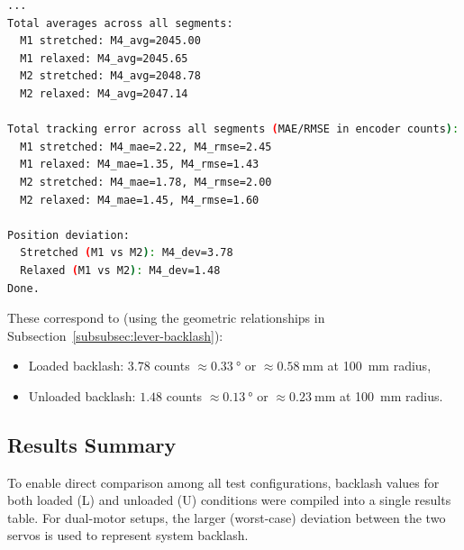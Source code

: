 \documentclass[11pt,letterpaper]{article}
\begin{document}
\begin{lstlisting}[language=bash, numbers=none]
...
Total averages across all segments:
  M1 stretched: M4_avg=2045.00
  M1 relaxed: M4_avg=2045.65
  M2 stretched: M4_avg=2048.78
  M2 relaxed: M4_avg=2047.14

Total tracking error across all segments (MAE/RMSE in encoder counts):
  M1 stretched: M4_mae=2.22, M4_rmse=2.45
  M1 relaxed: M4_mae=1.35, M4_rmse=1.43
  M2 stretched: M4_mae=1.78, M4_rmse=2.00
  M2 relaxed: M4_mae=1.45, M4_rmse=1.60

Position deviation:
  Stretched (M1 vs M2): M4_dev=3.78
  Relaxed (M1 vs M2): M4_dev=1.48
Done.
\end{lstlisting}

These correspond to (using the geometric relationships in Subsection~\ref{subsubsec:lever-backlash}):
\begin{itemize}
    \item Loaded backlash: $3.78$ counts $\approx \SI{0.33}{\degree}$ or $\approx \SI{0.58}{\milli\meter}$ at \SI{100}{\milli\meter} radius,
    \item Unloaded backlash: $1.48$ counts $\approx \SI{0.13}{\degree}$ or $\approx \SI{0.23}{\milli\meter}$ at \SI{100}{\milli\meter} radius.
\end{itemize}

\FloatBarrier

\subsection{Results Summary}
\label{subsec:results-summary}

To enable direct comparison among all test configurations, backlash values for both loaded (L) and unloaded (U) conditions were compiled into a single results table. For dual-motor setups, the larger (worst-case) deviation between the two servos is used to represent system backlash.
\end{document}
